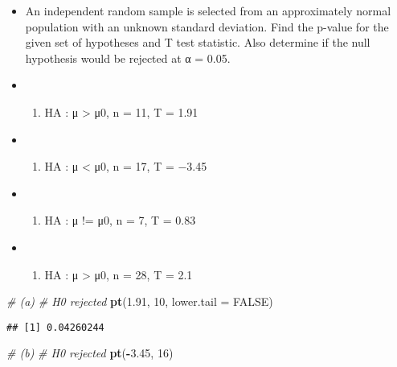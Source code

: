 \documentclass[]{book}
\newenvironment{Shaded}{\begin{snugshade}}{\end{snugshade}}
\newcommand{\CommentTok}[1]{\textcolor[rgb]{0.56,0.35,0.01}{\textit{#1}}}
\newcommand{\DataTypeTok}[1]{\textcolor[rgb]{0.13,0.29,0.53}{#1}}
\newcommand{\DecValTok}[1]{\textcolor[rgb]{0.00,0.00,0.81}{#1}}
\newcommand{\FloatTok}[1]{\textcolor[rgb]{0.00,0.00,0.81}{#1}}
\newcommand{\KeywordTok}[1]{\textcolor[rgb]{0.13,0.29,0.53}{\textbf{#1}}}
\newcommand{\NormalTok}[1]{#1}
\newcommand{\OperatorTok}[1]{\textcolor[rgb]{0.81,0.36,0.00}{\textbf{#1}}}
\newcommand{\OtherTok}[1]{\textcolor[rgb]{0.56,0.35,0.01}{#1}}
\providecommand{\tightlist}{%
  \setlength{\itemsep}{0pt}\setlength{\parskip}{0pt}}
\begin{document}
\begin{itemize}
\item
  An independent random sample is selected from an approximately normal population with an unknown standard deviation. Find the p-value for the given set of hypotheses and T test statistic. Also determine if the null hypothesis would be rejected at α = 0.05.
\item
  \begin{enumerate}
  \def\labelenumi{(\alph{enumi})}
  \tightlist
  \item
    HA : μ \textgreater{} μ0, n = 11, T = 1.91
  \end{enumerate}
\item
  \begin{enumerate}
  \def\labelenumi{(\alph{enumi})}
  \setcounter{enumi}{1}
  \tightlist
  \item
    HA : μ \textless{} μ0, n = 17, T = −3.45
  \end{enumerate}
\item
  \begin{enumerate}
  \def\labelenumi{(\alph{enumi})}
  \setcounter{enumi}{2}
  \tightlist
  \item
    HA : μ != μ0, n = 7, T = 0.83
  \end{enumerate}
\item
  \begin{enumerate}
  \def\labelenumi{(\alph{enumi})}
  \setcounter{enumi}{3}
  \tightlist
  \item
    HA : μ \textgreater{} μ0, n = 28, T = 2.1
  \end{enumerate}
\end{itemize}

\begin{Shaded}
\begin{Highlighting}[]
\CommentTok{# (a)}
\CommentTok{# H0 rejected}
\KeywordTok{pt}\NormalTok{(}\FloatTok{1.91}\NormalTok{, }\DecValTok{10}\NormalTok{, }\DataTypeTok{lower.tail =} \OtherTok{FALSE}\NormalTok{)}
\end{Highlighting}
\end{Shaded}

\begin{verbatim}
## [1] 0.04260244
\end{verbatim}

\begin{Shaded}
\begin{Highlighting}[]
\CommentTok{# (b)}
\CommentTok{# H0 rejected}
\KeywordTok{pt}\NormalTok{(}\OperatorTok{-}\FloatTok{3.45}\NormalTok{, }\DecValTok{16}\NormalTok{)}
\end{Highlighting}
\end{Shaded}
\end{document}
